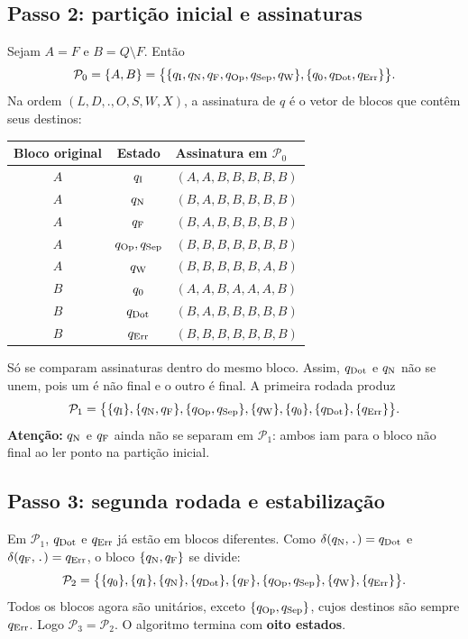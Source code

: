 \documentclass[12pt,a4paper]{article}
\begin{document}
\subsection{Passo 2: partição inicial e assinaturas}
Sejam $A=F$ e $B=Q\setminus F$. Então
\[
\mathcal{P}_0=\{A,B\}=
\big\{\{q_{\mathrm{I}},q_{\mathrm{N}},q_{\mathrm{F}},q_{\mathrm{Op}},q_{\mathrm{Sep}},q_{\mathrm{W}}\},
\{q_{\mathrm{0}},q_{\mathrm{Dot}},q_{\mathrm{Err}}\}\big\}.
\]
Na ordem $(L,D,.,O,S,W,X)$, a assinatura de $q$ é o vetor de blocos
que contêm seus destinos:
\begin{center}\small
\begin{tabular}{ccl}
\toprule Bloco original & Estado & Assinatura em $\mathcal{P}_0$\\\midrule
$A$ & $q_{\mathrm{I}}$ & $(A,A,B,B,B,B,B)$\\
$A$ & $q_{\mathrm{N}}$ & $(B,A,B,B,B,B,B)$\\
$A$ & $q_{\mathrm{F}}$ & $(B,A,B,B,B,B,B)$\\
$A$ & $q_{\mathrm{Op}},q_{\mathrm{Sep}}$ & $(B,B,B,B,B,B,B)$\\
$A$ & $q_{\mathrm{W}}$ & $(B,B,B,B,B,A,B)$\\
$B$ & $q_{\mathrm{0}}$ & $(A,A,B,A,A,A,B)$\\
$B$ & $q_{\mathrm{Dot}}$ & $(B,A,B,B,B,B,B)$\\
$B$ & $q_{\mathrm{Err}}$ & $(B,B,B,B,B,B,B)$\\\bottomrule
\end{tabular}\end{center}
Só se comparam assinaturas dentro do mesmo bloco. Assim, $q_{\mathrm{Dot}}$ e $q_{\mathrm{N}}$
não se unem, pois um é não final e o outro é final. A primeira rodada produz
\[
\mathcal{P}_1=\big\{\{q_{\mathrm{I}}\},\{q_{\mathrm{N}},q_{\mathrm{F}}\},\{q_{\mathrm{Op}},q_{\mathrm{Sep}}\},
\{q_{\mathrm{W}}\},\{q_{\mathrm{0}}\},\{q_{\mathrm{Dot}}\},\{q_{\mathrm{Err}}\}\big\}.
\]
\textbf{Atenção:} $q_{\mathrm{N}}$ e $q_{\mathrm{F}}$ ainda não se separam em $\mathcal{P}_1$:
ambos iam para o bloco não final ao ler ponto na partição inicial.

\subsection{Passo 3: segunda rodada e estabilização}
Em $\mathcal{P}_1$, $q_{\mathrm{Dot}}$ e $q_{\mathrm{Err}}$ já estão em blocos diferentes.
Como $\delta(q_{\mathrm{N}},\texttt{.})=q_{\mathrm{Dot}}$ e
$\delta(q_{\mathrm{F}},\texttt{.})=q_{\mathrm{Err}}$, o bloco $\{q_{\mathrm{N}},q_{\mathrm{F}}\}$ se divide:
\[
\mathcal{P}_2=\big\{\{q_{\mathrm{0}}\},\{q_{\mathrm{I}}\},\{q_{\mathrm{N}}\},\{q_{\mathrm{Dot}}\},
\{q_{\mathrm{F}}\},\{q_{\mathrm{Op}},q_{\mathrm{Sep}}\},\{q_{\mathrm{W}}\},\{q_{\mathrm{Err}}\}\big\}.
\]
Todos os blocos agora são unitários, exceto $\{q_{\mathrm{Op}},q_{\mathrm{Sep}}\}$, cujos
destinos são sempre $q_{\mathrm{Err}}$. Logo $\mathcal{P}_3=\mathcal{P}_2$.
O algoritmo termina com \textbf{oito estados}.
\end{document}
